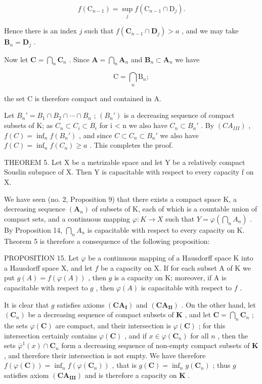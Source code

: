 \[
f \left(\mathrm{C} _ {n - 1}\right) = \sup _ {j} f \left(\mathrm{C} _ {n - 1} \cap \mathrm{D} _ {j}\right).
\]

Hence there is an index \(j\) such that \(f(\mathbf{C}_{n-1} \cap \mathbf{D}_j) > a\) , and we may take \(\mathbf{B}_n = \mathbf{D}_j\) .

Now let \(\mathbf{C} = \bigcap_{n}\mathbf{C}_{n}\) . Since \(\mathbf{A} = \bigcap_{n}\mathbf{A}_{n}\) and \(\mathbf{B}_n\subset \mathbf{A}_n\) we have

\[
\mathrm{C} = \bigcap_ {n} \mathrm{B} _ {n};
\]

the set C is therefore compact and contained in A.

Let \(B_n' = B_1 \cap B_2 \cap \cdots \cap B_n\) ; \((B_n')\) is a decreasing sequence of compact subsets of K; as \(C_n \subset C_i \subset B_i\) for i \textless{} n we also have \(C_n \subset B_n'\) . By \((CA_{III})\) , \(f(C) = \inf_{n} f(B_n')\) , and since \(C \subset C_n \subset B_n'\) we also have \(f(C) = \inf_{n} f(C_n) \geqslant a\) . This completes the proof.

THEOREM 5. Let X be a metrizable space and let Y be a relatively compact Souslin subspace of X. Then Y is capacitable with respect to every capacity f on X.

We have seen (no. 2, Proposition 9) that there exists a compact space K, a decreasing sequence \((\mathbf{A}_{n})\) of subsets of K, each of which is a countable union of compact sets, and a continuous mapping \(\varphi: K \to X\) such that \(Y = \varphi\left(\bigcap_{n} A_{n}\right)\) . By Proposition 14, \(\bigcap_{n} A_{n}\) is capacitable with respect to every capacity on K. Theorem 5 is therefore a consequence of the following proposition:

PROPOSITION 15. Let \(\varphi\) be a continuous mapping of a Hausdorff space K into a Hausdorff space X, and let \(f\) be a capacity on X. If for each subset A of K we put \(g(A) = f(\varphi(A))\) , then \(g\) is a capacity on K; moreover, if A is capacitable with respect to \(g\) , then \(\varphi(A)\) is capacitable with respect to \(f\) .

It is clear that \(g\) satisfies axioms \((\mathbf{CA}_{\mathbf{I}})\) and \((\mathbf{CA}_{\mathbf{II}})\) . On the other hand, let \((\mathbf{C}_n)\) be a decreasing sequence of compact subsets of \(\mathbf{K}\) , and let \(\mathbf{C} = \bigcap_{n} \mathbf{C}_n\) ; the sets \(\varphi(\mathbf{C})\) are compact, and their intersection is \(\varphi(\mathbf{C})\) ; for this intersection certainly contains \(\varphi(\mathbf{C})\) , and if \(x \in \varphi(\mathbf{C}_n)\) for all \(n\) , then the sets \(\overline{\varphi}^1(x) \cap \mathbf{C}_n\) form a decreasing sequence of non-empty compact subsets of \(\mathbf{K}\) , and therefore their intersection is not empty. We have therefore \(f(\varphi(\mathbf{C})) = \inf_{n} f(\varphi(\mathbf{C}_n))\) , that is \(g(\mathbf{C}) = \inf_{n} g(\mathbf{C}_n)\) ; thus \(g\) satisfies axiom \((\mathbf{CA}_{\mathbf{III}})\) and is therefore a capacity on \(\mathbf{K}\) .

